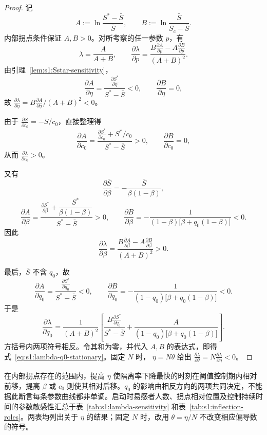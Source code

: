 \documentclass[lang=cn,a4paper,newtx]{elegantpaper}
\numberwithin{equation}{section}
\theoremstyle{plain}
\begin{document}
\begin{proof}
记
\[
A:=
\ln\frac{S^*-\bar S}{\bar S},
\qquad
B:=
\ln\frac{\bar S}{S_c-\bar S}.
\]
内部拐点条件保证 $A,B>0$。对所考察的任一参数 $p$，有
\[
\lambda=\frac{A}{A+B},
\qquad
\frac{\partial \lambda}{\partial p}
=
\frac{B\frac{\partial A}{\partial p}-A\frac{\partial B}{\partial p}}{(A+B)^2}.
\]
由引理~\ref{lem:s1:Sstar-sensitivity}，
\[
\frac{\partial A}{\partial \eta}
=
\frac{\frac{\partial S^*}{\partial \eta}}{S^*-\bar S}<0,
\qquad
\frac{\partial B}{\partial \eta}=0,
\]
故 $\frac{\partial \lambda}{\partial \eta}=B\frac{\partial A}{\partial \eta}/(A+B)^2<0$。

由于 $\frac{\partial \bar S}{\partial c_0}=-\bar S/c_0$，直接整理得
\[
\frac{\partial A}{\partial c_0}
=
\frac{\frac{\partial S^*}{\partial c_0}+S^*/c_0}{S^*-\bar S}>0,
\qquad
\frac{\partial B}{\partial c_0}=0,
\]
从而 $\frac{\partial \lambda}{\partial c_0}>0$。

又有
\[
\frac{\partial \bar S}{\partial \beta}
=
-\frac{\bar S}{\beta(1-\beta)},
\]
\[
\frac{\partial A}{\partial \beta}
=
\frac{
\frac{\partial S^*}{\partial \beta}+\dfrac{S^*}{\beta(1-\beta)}
}{
S^*-\bar S
}>0,
\qquad
\frac{\partial B}{\partial \beta}
=
-\frac{1}{
(1-\beta)\bigl[\beta+q_0(1-\beta)\bigr]
}<0.
\]
因此
\[
\frac{\partial \lambda}{\partial \beta}
=
\frac{B\frac{\partial A}{\partial \beta}-A\frac{\partial B}{\partial \beta}}{(A+B)^2}>0.
\]

最后，$\bar S$ 不含 $q_0$，故
\[
\frac{\partial A}{\partial q_0}
=
\frac{\frac{\partial S^*}{\partial q_0}}{S^*-\bar S}<0,
\qquad
\frac{\partial B}{\partial q_0}
=
-\frac{1}{
(1-q_0)\bigl[\beta+q_0(1-\beta)\bigr]
}<0.
\]
于是
\[
\frac{\partial \lambda}{\partial q_0}
=
\frac{1}{(A+B)^2}
\left[
\frac{B \frac{\partial S^*}{\partial q_0}}{S^*-\bar S}
+
\frac{A}{
(1-q_0)\bigl[\beta+q_0(1-\beta)\bigr]
}
\right].
\]
方括号内两项符号相反。令其和为零，并代入 $A,B$ 的表达式，即得
式~\eqref{eq:s1:lambda-q0-stationary}。固定 $N$ 时，
$\eta=N\theta$ 给出 $\frac{\partial \lambda}{\partial \theta}=N\frac{\partial \lambda}{\partial \eta}<0$。
\end{proof}


在内部拐点存在的范围内，提高 $\eta$ 使隔离率下降最快的时刻在阈值控制期内相对前移，提高 $\beta$ 或 $c_0$ 则使其相对后移。$q_0$ 的影响由相反方向的两项共同决定，不能据此断言每条参数曲线都非单调。启动时易感者人数、拐点相对位置及控制持续时间的参数敏感性汇总于表~\ref{tab:s1:lambda-sensitivity} 和表~\ref{tab:s1:inflection-roles}。两表均列出关于 $\eta$ 的结果；固定 $N$ 时，改用 $\theta=\eta/N$ 不改变相应偏导数的符号。
\end{document}
